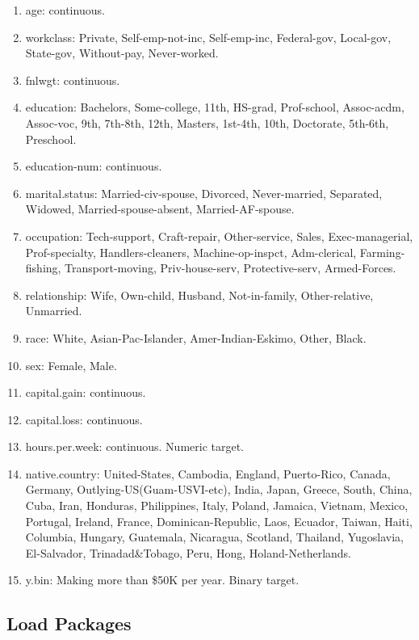 \documentclass[12pt,]{article}
\providecommand{\tightlist}{%
  \setlength{\itemsep}{0pt}\setlength{\parskip}{0pt}}
\begin{document}
\begin{enumerate}
\def\labelenumi{\arabic{enumi}.}
\tightlist
\item
  age: continuous.
\item
  workclass: Private, Self-emp-not-inc, Self-emp-inc, Federal-gov,
  Local-gov, State-gov, Without-pay, Never-worked.
\item
  fnlwgt: continuous.
\item
  education: Bachelors, Some-college, 11th, HS-grad, Prof-school,
  Assoc-acdm, Assoc-voc, 9th, 7th-8th, 12th, Masters, 1st-4th, 10th,
  Doctorate, 5th-6th, Preschool.
\item
  education-num: continuous.
\item
  marital.status: Married-civ-spouse, Divorced, Never-married,
  Separated, Widowed, Married-spouse-absent, Married-AF-spouse.
\item
  occupation: Tech-support, Craft-repair, Other-service, Sales,
  Exec-managerial, Prof-specialty, Handlers-cleaners, Machine-op-inspct,
  Adm-clerical, Farming-fishing, Transport-moving, Priv-house-serv,
  Protective-serv, Armed-Forces.
\item
  relationship: Wife, Own-child, Husband, Not-in-family, Other-relative,
  Unmarried.
\item
  race: White, Asian-Pac-Islander, Amer-Indian-Eskimo, Other, Black.
\item
  sex: Female, Male.
\item
  capital.gain: continuous.
\item
  capital.loss: continuous.
\item
  hours.per.week: continuous. Numeric target.
\item
  native.country: United-States, Cambodia, England, Puerto-Rico, Canada,
  Germany, Outlying-US(Guam-USVI-etc), India, Japan, Greece, South,
  China, Cuba, Iran, Honduras, Philippines, Italy, Poland, Jamaica,
  Vietnam, Mexico, Portugal, Ireland, France, Dominican-Republic, Laos,
  Ecuador, Taiwan, Haiti, Columbia, Hungary, Guatemala, Nicaragua,
  Scotland, Thailand, Yugoslavia, El-Salvador, Trinadad\&Tobago, Peru,
  Hong, Holand-Netherlands.
\item
  y.bin: Making more than \$50K per year. Binary target.
\end{enumerate}

\hypertarget{load-packages}{%
\subsection{Load Packages}\label{load-packages}}
\end{document}
